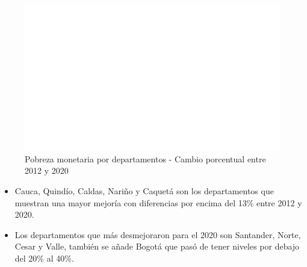     \begin{figure}[H]
        \caption{Pobreza monetaria por departamentos - Cambio porcentual entre 2012 y 2020 \label{map_result_2} }
        \begin{center}
        \includegraphics[width=\textwidth,keepaspectratio]{img/var_262_map_change.png}
        \end{center}
    \end{figure}
            \begin{itemize}
                    \item Cauca, Quindío, Caldas, Nariño y Caquetá son los departamentos que muestran una mayor mejoría con diferencias por encima del 13\% entre 2012 y 2020.
                    \item Los departamentos que más desmejoraron para el 2020 son Santander, Norte, Cesar y Valle, también se añade Bogotá que pasó de tener niveles por debajo del 20\% al 40\%.
                    \end{itemize}

